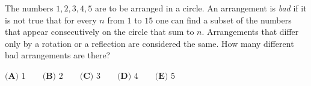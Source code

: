 The numbers $1,2,3,4,5$ are to be arranged in a circle. An arrangement is \emph{bad} if it is not true that for every $n$ from $1$ to $15$ one can find a subset of the numbers that appear consecutively on the circle that sum to $n$. Arrangements that differ only by a rotation or a reflection are considered the same. How many different bad arrangements are there?

$\textbf{(A) }1\qquad\textbf{(B) }2\qquad\textbf{(C) }3\qquad\textbf{(D) }4\qquad\textbf{(E) }5$
